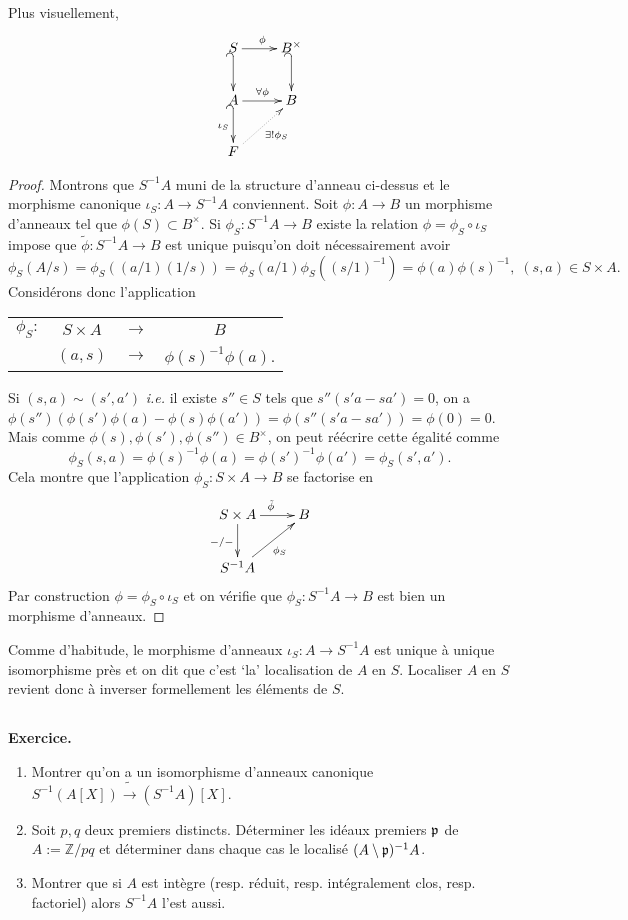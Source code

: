 \documentclass[a4paper, oneside, 12pt]{book}
\theoremstyle{definition} %
\newcommand{\ie}{\textit{i.e.}} %
\newcommand{\Z}{\mathbb{Z}}
\begin{document}
 
  Plus visuellement,
	$$\xymatrix{
		S\ar[r]^\phi\ar@{_{(}->}[d]&B^\times\ar@{_{(}->}[d] \\
		A\ar[r]^{\forall\phi}\ar@{_{(}->}[d]_{\iota_S}&B \\
		F\ar@{.>}[ur]_{\exists ! \phi_S}}
	$$

 \begin{proof} Montrons que  $S^{-1}A$ muni de la structure d'anneau ci-dessus et le morphisme canonique $\iota_S:A\rightarrow S^{-1}A$ conviennent. Soit $\phi:A\rightarrow B$  un morphisme d'anneaux tel que $\phi(S)\subset B^\times$.  Si $\phi_S:S^{-1}A\rightarrow B$ existe la relation $\phi=  \phi_S\circ \iota_S$ impose que  $\tilde{\phi}:S^{-1}A\rightarrow B$ est unique puisqu'on doit nécessairement avoir 
 $$\phi_S(A/s)=\phi_S((a/1)(1/s))=\phi_S(a/1)\phi_S((s/1)^{-1})=\phi(a)\phi(s)^{-1},\; (s,a)\in S\times A.$$
 Considérons donc l'application  \begin{tabular}[t]{lclc}
 $\phi_S:$&$ S\times A $&$\rightarrow$&$B$\\
 &$(a,s) $&$\rightarrow$&$ \phi(s)^{-1}\phi(a)$.
 \end{tabular} 
 Si $(s,a)\sim (s',a')$  \ie{} il existe $s''\in S$ tels que $s''(s'a-sa')=0$, on a $\phi(s'')(\phi(s')\phi(a)-\phi(s)\phi(a'))=\phi(s''(s'a-sa'))=\phi(0)=0$. Mais comme $\phi(s),\phi(s'),\phi(s'')\in B^{\times}$, on peut réécrire cette égalité comme 
 $$\phi_S(s,a)=\phi(s)^{-1}\phi(a)=\phi(s')^{-1}\phi(a')=\phi_S(s',a').$$
 Cela montre que l'application $\phi_S: S\times A  \rightarrow  B$ se factorise  en 
 $$\xymatrix{S\times A \ar[r]^{\tilde{\phi}}\ar[d]_{  -/-}& B\\
 S^{-1}A \ar[ur]_{\phi_S}&} $$
Par construction $\phi=  \phi_S\circ \iota_S$ et on vérifie que $\phi_S:S^{-1}A\rightarrow B$ est bien un morphisme d'anneaux. 
  \end{proof}
 
  Comme d'habitude, le morphisme d'anneaux  $\iota_S:A\rightarrow S^{-1}A$ est unique à unique isomorphisme près et on dit que  c'est `la' localisation de $A$ en $S$. Localiser $A$ en $S$ revient donc à inverser formellement les éléments de $S$.  \\
 
 \subsection{}\label{LocExo1}\textbf{Exercice.} 
 \begin{enumerate}
 \item  Montrer qu'on a un isomorphisme  d'anneaux canonique $S^{-1}(A[X])\tilde{\rightarrow} (S^{-1}A)[X]$.
 \item Soit $p,q$ deux premiers distincts. Déterminer les idéaux premiers $\frak{p}$ de $A:=\Z/pq$ et déterminer dans chaque cas le localisé $(A\setminus \frak{p})^{-1}A$.
 \item Montrer que si $A$ est intègre (resp. réduit, resp. intégralement clos, resp. factoriel) alors $S^{-1}A$ l'est aussi.\\
 \end{enumerate}
 
\end{document}
